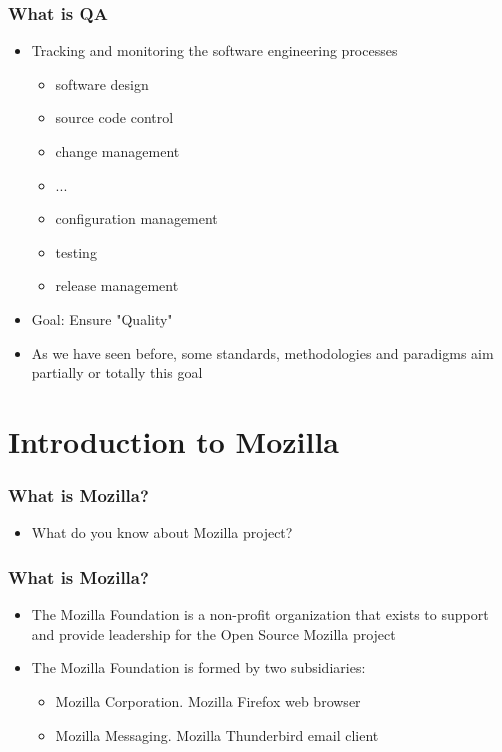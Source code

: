 \documentclass{beamer}
\begin{document}
\begin{frame}
\frametitle{What is QA}
\begin{itemize}
\item Tracking and monitoring the software engineering processes
    \begin{itemize}
       \item software design 
       \item source code control 
       \item change management 
       \item ...
       \item configuration management 
       \item testing 
       \item release management
    \end{itemize}
\item Goal: Ensure "Quality"
\item As we have seen before, some standards, methodologies and paradigms aim partially or totally this goal
\end{itemize}
\end{frame}


\section{Introduction to Mozilla}


\begin{frame}
\frametitle{What is Mozilla?}
 \begin{itemize}
 \item What do you know about Mozilla project?
 \end{itemize}
\end{frame}



\begin{frame}
\frametitle{What is Mozilla?}
 \begin{itemize}
 \item The Mozilla Foundation is a non-profit organization that exists to support and provide leadership for the Open Source Mozilla project
 \item The Mozilla Foundation is formed by two subsidiaries:
     \begin{itemize}
     \item Mozilla Corporation. Mozilla Firefox web browser
     \item Mozilla Messaging. Mozilla Thunderbird email client
     \end{itemize}

 \end{itemize}
\end{frame}
\end{document}

